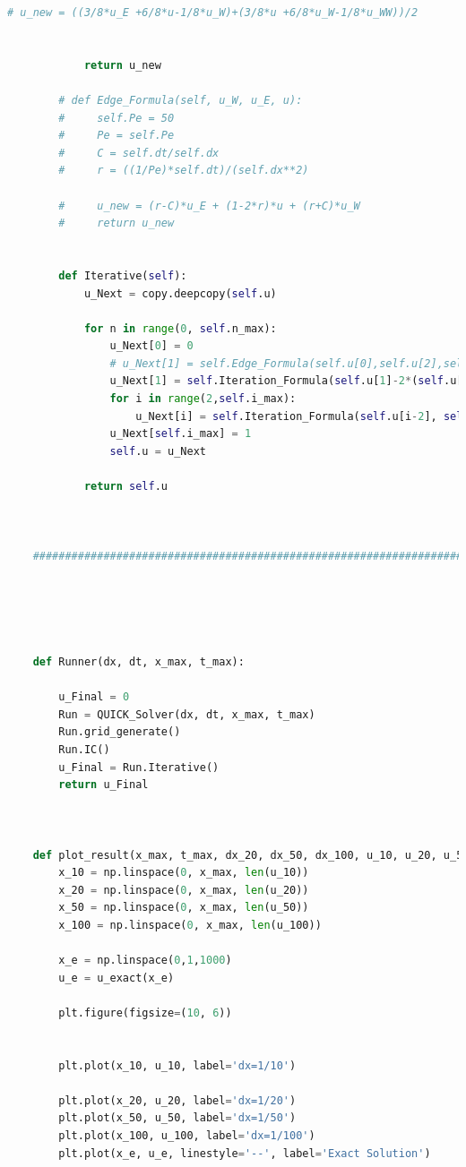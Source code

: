 \documentclass[12pt]{article}
\begin{document}
\begin{scriptsize}
\begin{lstlisting}[language=python,caption={Problem2, QUICK Solver updated}]
            # u_new = ((3/8*u_E +6/8*u-1/8*u_W)+(3/8*u +6/8*u_W-1/8*u_WW))/2 
    
    
            return u_new
        
        # def Edge_Formula(self, u_W, u_E, u):
        #     self.Pe = 50
        #     Pe = self.Pe
        #     C = self.dt/self.dx
        #     r = ((1/Pe)*self.dt)/(self.dx**2)
    
        #     u_new = (r-C)*u_E + (1-2*r)*u + (r+C)*u_W
        #     return u_new
        
    
        def Iterative(self):
            u_Next = copy.deepcopy(self.u)
    
            for n in range(0, self.n_max):
                u_Next[0] = 0
                # u_Next[1] = self.Edge_Formula(self.u[0],self.u[2],self.u[1])
                u_Next[1] = self.Iteration_Formula(self.u[1]-2*(self.u[0]-self.u[1]), self.u[0], self.u[2], self.u[1])
                for i in range(2,self.i_max):
                    u_Next[i] = self.Iteration_Formula(self.u[i-2], self.u[i-1], self.u[i+1], self.u[i])
                u_Next[self.i_max] = 1
                self.u = u_Next
    
            return self.u
        
     
    
    ###############################################################################################
    
    
        
    
    
    def Runner(dx, dt, x_max, t_max):
    
        u_Final = 0
        Run = QUICK_Solver(dx, dt, x_max, t_max)
        Run.grid_generate()
        Run.IC()
        u_Final = Run.Iterative()
        return u_Final
    
    
    
    def plot_result(x_max, t_max, dx_20, dx_50, dx_100, u_10, u_20, u_50, u_100):
        x_10 = np.linspace(0, x_max, len(u_10))
        x_20 = np.linspace(0, x_max, len(u_20))
        x_50 = np.linspace(0, x_max, len(u_50))
        x_100 = np.linspace(0, x_max, len(u_100))
    
        x_e = np.linspace(0,1,1000)
        u_e = u_exact(x_e)
    
        plt.figure(figsize=(10, 6))
    
    
        plt.plot(x_10, u_10, label='dx=1/10')
    
        plt.plot(x_20, u_20, label='dx=1/20')
        plt.plot(x_50, u_50, label='dx=1/50')
        plt.plot(x_100, u_100, label='dx=1/100')
        plt.plot(x_e, u_e, linestyle='--', label='Exact Solution')
    

\end{lstlisting}
\end{scriptsize}
\end{document}
